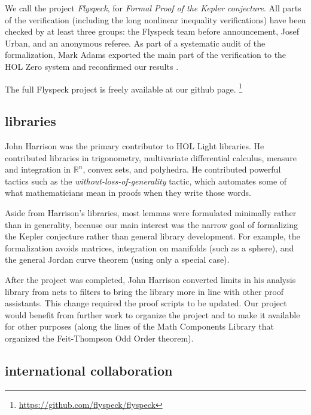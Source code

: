 \documentclass{amsart}
\newcommand{\ring}[1]{\mathbb{#1}}
\begin{document}
We call the project \emph{Flyspeck}, for \emph{Formal Proof of the
  Kepler conjecture}.  All parts of the verification (including the
long nonlinear inequality verifications) have been checked by at least
three groups: the Flyspeck team before announcement, Josef Urban, and
an anonymous referee.  As part of a systematic audit of the
formalization, Mark Adams exported the main part of the verification
to the HOL Zero system and reconfirmed our results \cite{adams2014flyspecking}.

The full Flyspeck project is freely available at our github page.%
\footnote{\url{https://github.com/flyspeck/flyspeck}}



\subsection{libraries}

John Harrison was the primary contributor to HOL Light libraries.  He
contributed libraries in trigonometry, multivariate differential
calculus, measure and integration in $\ring{R}^n$, convex sets, and
polyhedra.  He contributed powerful tactics such as the
\emph{without-loss-of-generality} tactic, which automates some of what
mathematicians mean in proofs when they write those words.

Aside from Harrison's libraries, most lemmas
were formulated minimally rather
than in generality, because our main interest was the narrow
goal of formalizing the Kepler conjecture rather than general
library development.  For example, the formalization avoids matrices,
integration on manifolds (such as a sphere), and the general Jordan
curve theorem (using only a special case).

After the project was completed, John Harrison converted limits in his
analysis library from nets to filters to bring the library more in
line with other proof assistants.  This change required the proof
scripts to be updated.
Our project would benefit from further work to organize the project
and to make it available for other purposes (along the lines
of the Math Components Library that organized the Feit-Thompson
Odd Order theorem).

\subsection{international collaboration}
\end{document}
